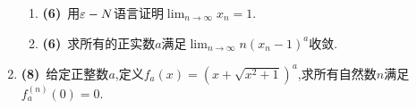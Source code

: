 \documentclass{ctexart}
\begin{document}
\begin{enumerate}[leftmargin=*,label=\textbf{\arabic*.}]
        \begin{enumerate}[label=\textbf{(\arabic*)}]
            \item \textbf{(6)}\ 用$\varepsilon-N$语言证明$\displaystyle\lim_{n\to\infty}x_n=1$.
            \item \textbf{(6)}\ 求所有的正实数$a$满足$\displaystyle\lim_{n\to\infty}n(x_n-1)^a$收敛.
        \end{enumerate}
    \item \textbf{(8)}\ 给定正整数$a$,定义$f_a(x)=\left(x+\sqrt{x^2+1}\right)^a$,求所有自然数$n$满足$f_a^{(n)}(0)=0$.
\end{enumerate}
\end{document}
